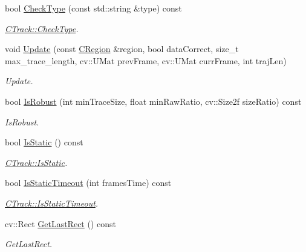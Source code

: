 \begin{DoxyCompactItemize}
bool \mbox{\hyperlink{class_c_track_ae6961feb57624fbb2746b07b06769368}{Check\+Type}} (const std\+::string \&type) const
\begin{DoxyCompactList}\small\item\em \mbox{\hyperlink{class_c_track_ae6961feb57624fbb2746b07b06769368}{C\+Track\+::\+Check\+Type}}. \end{DoxyCompactList}\item 
void \mbox{\hyperlink{class_c_track_a582c4e1ad42d5985e0f395fa5a48bdbc}{Update}} (const \mbox{\hyperlink{class_c_region}{C\+Region}} \&region, bool data\+Correct, size\+\_\+t max\+\_\+trace\+\_\+length, cv\+::\+U\+Mat prev\+Frame, cv\+::\+U\+Mat curr\+Frame, int traj\+Len)
\begin{DoxyCompactList}\small\item\em Update. \end{DoxyCompactList}\item 
bool \mbox{\hyperlink{class_c_track_a925ad52d3067abad455e2419610a286f}{Is\+Robust}} (int min\+Trace\+Size, float min\+Raw\+Ratio, cv\+::\+Size2f size\+Ratio) const
\begin{DoxyCompactList}\small\item\em Is\+Robust. \end{DoxyCompactList}\item 
bool \mbox{\hyperlink{class_c_track_a4f3265c10e4ad24b8b7b10668edfa309}{Is\+Static}} () const
\begin{DoxyCompactList}\small\item\em \mbox{\hyperlink{class_c_track_a4f3265c10e4ad24b8b7b10668edfa309}{C\+Track\+::\+Is\+Static}}. \end{DoxyCompactList}\item 
bool \mbox{\hyperlink{class_c_track_a815097c7b43655fcd5954d817493198c}{Is\+Static\+Timeout}} (int frames\+Time) const
\begin{DoxyCompactList}\small\item\em \mbox{\hyperlink{class_c_track_a815097c7b43655fcd5954d817493198c}{C\+Track\+::\+Is\+Static\+Timeout}}. \end{DoxyCompactList}\item 
cv\+::\+Rect \mbox{\hyperlink{class_c_track_abe6c22779a5d7f0403980f4b4c647ade}{Get\+Last\+Rect}} () const
\begin{DoxyCompactList}\small\item\em Get\+Last\+Rect. \end{DoxyCompactList}\end{DoxyCompactItemize}
